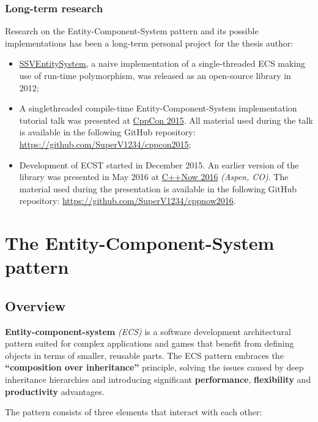 \documentclass[twoside, 12pt, a4paper, openright]{book}
\begin{document}
\section{Long-term research}\label{long-term-research}

Research on the Entity-Component-System pattern and its possible
implementations has been a long-term personal project for the thesis
author:

\begin{itemize}
\item
  \href{https://github.com/SuperV1234/SSVEntitySystem}{SSVEntitySystem},
  a naive implementation of a single-threaded ECS making use of run-time
  polymorphism, was released as an open-source library in 2012;
\item
  A singlethreaded compile-time Entity-Component-System implementation
  tutorial talk was presented at \href{http://cppcon.org}{CppCon 2015}.
  All material used during the talk is available in the following GitHub
  repository: \url{https://github.com/SuperV1234/cppcon2015};
\item
  Development of ECST started in December 2015. An earlier version of
  the library was presented in May 2016 at
  \href{http://cppnow.org}{C++Now 2016} \emph{(Aspen, CO)}. The material
  used during the presentation is available in the following GitHub
  repository: \url{https://github.com/SuperV1234/cppnow2016}.
\end{itemize}

\part{The Entity-Component-System pattern}

\hypertarget{ecs_part_overview}{\chapter{Overview}\label{ecs_part_overview}}

\textbf{Entity-component-system} \emph{(ECS)} is a software development
architectural pattern suited for complex applications and games that
benefit from defining objects in terms of smaller, reusable parts. The
ECS pattern embraces the \textbf{``composition over inheritance''}
principle, solving the issues caused by deep inheritance hierarchies and
introducing significant \textbf{performance}, \textbf{flexibility} and
\textbf{productivity} advantages.

The pattern consists of three elements that interact with each other:
\end{document}

